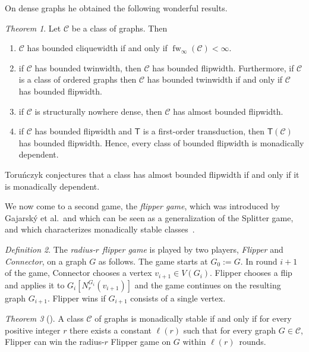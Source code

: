 \documentclass[1p,number,a4paper]{elsarticle}
\theoremstyle{remark}
\newcommand{\Cc}{\mathscr{C}}
\DeclareMathOperator{\fw}{fw}
\newtheorem{theorem}{Theorem}[section]
\newtheorem{definition}[theorem]{Definition}
\begin{document}
On dense graphs he obtained the following wonderful results. 

\begin{theorem}
    Let $\Cc$ be a class of graphs. Then 
    \begin{enumerate}
        \item $\Cc$ has bounded cliquewidth if and only if $\fw_\infty(\Cc)<\infty$.
        \item if $\Cc$ has bounded twinwidth, then $\Cc$ has bounded flipwidth. Furthermore, if $\Cc$ is a class of ordered graphs then $\Cc$ has bounded twinwidth if and only if $\Cc$ has bounded flipwidth. 
        \item if $\Cc$ is structurally nowhere dense, then $\Cc$ has almost bounded flipwidth. 
        \item if $\Cc$ has bounded flipwidth and $\mathsf{T}$ is a first-order transduction, then $\mathsf{T}(\Cc)$ has bounded flipwidth. 
        Hence, every class of bounded flipwidth is monadically dependent. 
    \end{enumerate}
\end{theorem}

Toru\'nczyk conjectures that a class has almost bounded flipwidth if and only if it is monadically dependent. 

\bigskip
We now come to a second game, the \emph{flipper game}, which was introduced by Gajarsk\'y et al.\ and which can be seen as a generalization of the Splitter game, and which characterizes monadically stable classes~\cite{gajarsky2023flipper}. 

\begin{definition}
    The \emph{radius-$r$ flipper game} is played by two players, \emph{Flipper} and \emph{Connector}, on a graph $G$ as follows.
The game starts at $G_0:=G$. In round $i+1$ of the game, Connector chooses a vertex $v_{i+1}\in V(G_i)$. 
Flipper chooses a flip and applies it to $G_i[N_r^{G_i}(v_{i+1})]$ and the game continues on the resulting graph $G_{i+1}$. Flipper wins if $G_{i+1}$ consists of a single vertex. 
\end{definition}


\begin{theorem}[\cite{gajarsky2023flipper}]
    A class $\Cc$ of graphs is monadically stable if and only if for every positive integer $r$ there exists a constant $\ell(r)$ such that for every graph $G\in \Cc$, Flipper can win the radius-$r$ Flipper game on $G$ within $\ell(r)$~rounds. 
\end{theorem}
\end{document}
